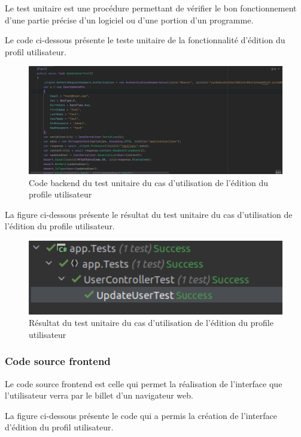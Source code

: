 Le test unitaire est une procédure permettant de vérifier le bon fonctionnement d'une partie précise d'un logiciel ou d'une portion d'un programme. 

Le code ci-dessous présente le teste unitaire de la fonctionnalité d'édition du profil utilisateur.

\begin{figure}[H]
	\centering
	\includegraphics[width=1\textwidth]{img/utupdate}
	\caption{Code backend du test unitaire du cas d'utilisation de l'édition du profile utilisateur}
	\label{fig:mesh1}
\end{figure}

La figure ci-dessous présente le résultat du test unitaire du cas d'utilisation de l'édition du profile utilisateur.

\begin{figure}[H]
	\centering
	\includegraphics[width=1\textwidth]{img/uutr}
	\caption{Résultat du test unitaire du cas d'utilisation de l'édition du profile utilisateur}
	\label{fig:mesh1}
\end{figure}

\subsubsection{Code source frontend}

Le code source frontend est celle qui permet la réalisation de l'interface que l'utilisateur verra par le billet d'un navigateur web.

La figure ci-dessous présente le code qui a permis la création de l'interface d'édition du profil utilisateur.

